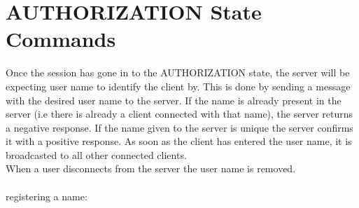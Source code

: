 \documentclass[a4paper,11pt]{article}
\begin{document}
\section{AUTHORIZATION State Commands}
%
%
Once the session has gone in to the AUTHORIZATION state, the server will be expecting user name to identify the client by. This is done by sending a message with the desired user name to the server. If the name is already present in the server (i.e there is already a client connected with that name), the server returns a negative response. If the name given to the server is unique the server confirms it with a positive response. As soon as the client has entered the user name, it is broadcasted to all other connected clients.\\ 
When a user disconnects from the server the user name is removed.\\\\
registering a name:
\end{document}
